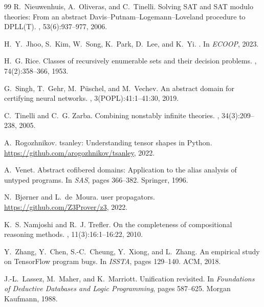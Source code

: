 \documentclass[11pt]{article}
\begin{document}
\begin{thebibliography}{99}
R.~Nieuwenhuis, A.~Oliveras, and C.~Tinelli.
\newblock Solving {SAT} and {SAT} modulo theories: From an abstract
  {Davis--Putnam--Logemann--Loveland} procedure to {DPLL(T)}.
, 53(6):937--977, 2006.

H.~Y.~Jhoo, S.~Kim, W.~Song, K.~Park, D.~Lee, and K.~Yi.
.
\newblock In {\em ECOOP}, 2023.

H.~G. Rice.
\newblock Classes of recursively enumerable sets and their decision problems.
, 74(2):358--366, 1953.

G.~Singh, T.~Gehr, M.~P\"uschel, and M.~Vechev.
\newblock An abstract domain for certifying neural networks.
, 3(POPL):41:1--41:30, 2019.


C.~Tinelli and C.~G. Zarba.
\newblock Combining nonstably infinite theories.
, 34(3):209--238, 2005.

A.~Rogozhnikov.
\newblock tsanley: Understanding tensor shapes in {Python}.
\newblock \url{https://github.com/arogozhnikov/tsanley}, 2022.

A.~Venet.
\newblock Abstract cofibered domains: Application to the alias analysis of
  untyped programs.
\newblock In {\em SAS}, pages 366--382. Springer, 1996.

N.~Bj{\o}rner and L.~de~Moura.
 user propagators.
\newblock \url{https://github.com/Z3Prover/z3}, 2022.

K.~S. Namjoshi and R.~J. Trefler.
\newblock On the completeness of compositional reasoning methods.
, 11(3):16:1--16:22, 2010.

Y.~Zhang, Y.~Chen, S.-C.~Cheung, Y.~Xiong, and L.~Zhang.
\newblock An empirical study on {TensorFlow} program bugs.
\newblock In {\em ISSTA}, pages 129--140. ACM, 2018.

J.-L.~Lassez, M.~Maher, and K.~Marriott.
\newblock Unification revisited.
\newblock In {\em Foundations of Deductive Databases and Logic Programming},
  pages 587--625. Morgan Kaufmann, 1988.

\end{thebibliography}
\end{document}

